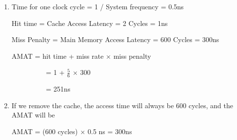 \begin{questions}
{
    \begin{solution}

        \begin{enumerate}
            \item Time for one clock cycle = 1 / System frequency = 0.5ns

            Hit time = Cache Access Latency = 2 Cycles = 1ns
    
            Miss Penalty = Main Memory Access Latency = 600 Cycles = 300ns
    
            AMAT = hit time + miss rate $\times$ miss penalty
    
            \ \ \ \ \ \ \ \ \ \ = 1 + $\frac{5}{6}$ $\times$ 300
    
            \ \ \ \ \ \ \ \ \ \ = 251ns

            \item If we remove the cache, the access time will always be 600 cycles, and the AMAT will be 

            AMAT = (600 cycles) $\times$ 0.5 ns = 300ns
        \end{enumerate}

        \vspace{2in}
    \end{solution}
}

\end{questions}